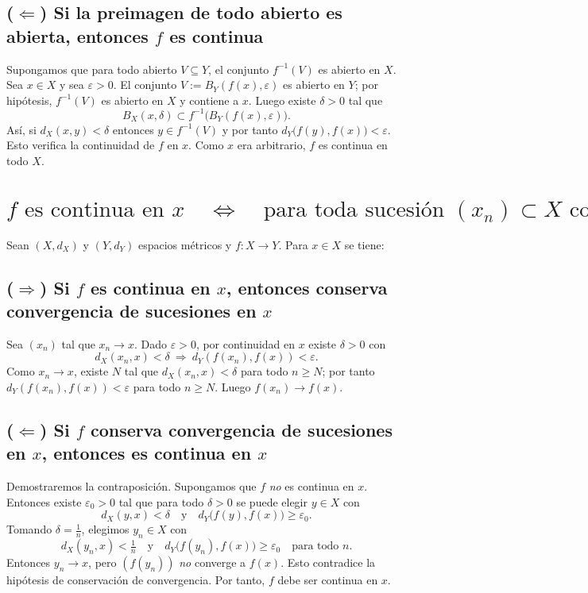 \documentclass[12pt]{article}
\begin{document}
\subsection*{($\Leftarrow$) Si la preimagen de todo abierto es abierta, entonces $f$ es continua}
Supongamos que para todo abierto $V\subseteq Y$, el conjunto $f^{-1}(V)$ es abierto en $X$.
Sea $x\in X$ y sea $\varepsilon>0$. El conjunto $V:=B_Y(f(x),\varepsilon)$ es abierto en $Y$; por hipótesis,
$f^{-1}(V)$ es abierto en $X$ y contiene a $x$. Luego existe $\delta>0$ tal que
\[
B_X(x,\delta)\subset f^{-1}\bigl(B_Y(f(x),\varepsilon)\bigr).
\]
Así, si $d_X(x,y)<\delta$ entonces $y\in f^{-1}(V)$ y por tanto
$d_Y\bigl(f(y),f(x)\bigr)<\varepsilon$. Esto verifica la continuidad de $f$ en $x$.
Como $x$ era arbitrario, $f$ es continua en todo $X$.

\section*{\(f \text{ es continua en } x \quad \Longleftrightarrow \quad
\text{para toda sucesión } (x_n)\subset X \text{ con } x_n \to x,\ \ f(x_n) \to f(x).\)}

Sean $(X,d_X)$ y $(Y,d_Y)$ espacios métricos y $f:X\to Y$. Para $x\in X$ se tiene:

\subsection*{($\Rightarrow$) Si $f$ es continua en $x$, entonces conserva convergencia de sucesiones en $x$}
Sea $(x_n)$ tal que $x_n\to x$. Dado $\varepsilon>0$, por continuidad en $x$ existe $\delta>0$ con
\[
d_X(x_n,x)<\delta \ \Longrightarrow\ d_Y(f(x_n),f(x))<\varepsilon.
\]
Como $x_n\to x$, existe $N$ tal que $d_X(x_n,x)<\delta$ para todo $n\ge N$; por tanto
$d_Y(f(x_n),f(x))<\varepsilon$ para todo $n\ge N$. Luego $f(x_n)\to f(x)$.

\subsection*{($\Leftarrow$) Si $f$ conserva convergencia de sucesiones en $x$, entonces es continua en $x$}
Demostraremos la contraposición. Supongamos que $f$ \emph{no} es continua en $x$. Entonces existe
$\varepsilon_0>0$ tal que para todo $\delta>0$ se puede elegir $y\in X$ con
\[
d_X(y,x)<\delta \quad \text{y} \quad d_Y\big(f(y),f(x)\big)\ge \varepsilon_0.
\]
Tomando $\delta=\tfrac{1}{n}$, elegimos $y_n\in X$ con
\[
d_X(y_n,x)<\tfrac{1}{n}
\quad\text{y}\quad
d_Y\big(f(y_n),f(x)\big)\ge \varepsilon_0 \quad \text{para todo } n.
\]
Entonces $y_n\to x$, pero $(f(y_n))$ \emph{no} converge a $f(x)$. Esto contradice la hipótesis de conservación de convergencia.
Por tanto, $f$ debe ser continua en $x$.
\end{document}
